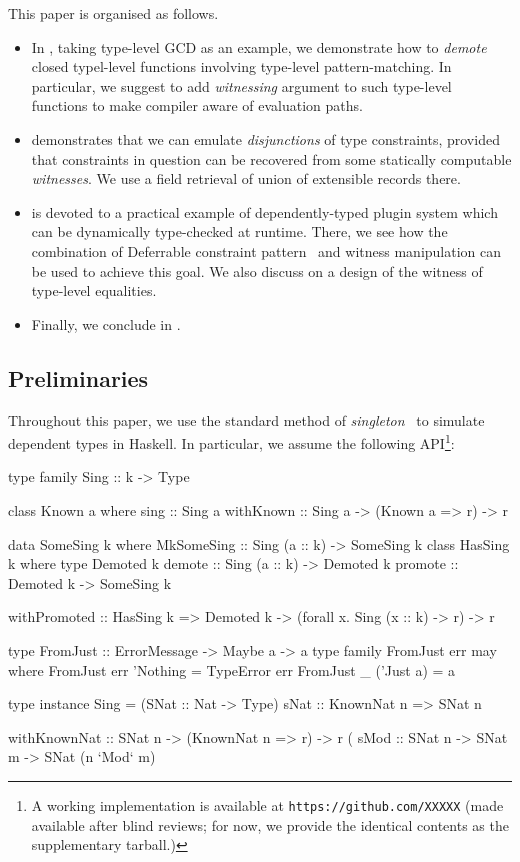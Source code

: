 \documentclass[demotion-paper.tex]{subfiles}
\begin{document}
This paper is organised as follows.
\begin{itemize}
  \item In , taking type-level GCD as an example, we demonstrate how to \emph{demote} closed typel-level functions involving type-level pattern-matching.
  In particular, we suggest to add \emph{witnessing} argument to such type-level functions to make compiler aware of evaluation paths.
  \item {} demonstrates that we can emulate \emph{disjunctions} of type constraints, provided that constraints in question can be recovered from some statically computable \emph{witnesses}.
  We use a field retrieval of union of extensible records there.
  \item {} is devoted to a practical example of dependently-typed plugin system which can be dynamically type-checked at runtime.
  There, we see how the combination of Deferrable constraint pattern~\cite{Kmett:2020ab} and witness manipulation can be used to achieve this goal.
  We also discuss on a design of the witness of type-level equalities.
  \item Finally, we conclude in .
\end{itemize}

\subsection{Preliminaries}
Throughout this paper, we use the standard method of \emph{singleton}~\cite{Eisenberg:2012} to simulate dependent types in Haskell.
In particular, we assume the following API\footnote{A working implementation is available at \texttt{https://github.com/XXXXX} (made available after blind reviews; for now, we provide the identical contents as the supplementary tarball.)}:

\begin{code}
type family Sing :: k -> Type

class Known a where
  sing :: Sing a
withKnown :: Sing a -> (Known a => r) -> r

data SomeSing k where
  MkSomeSing :: Sing (a :: k) -> SomeSing k
class HasSing k where
  type Demoted k 
  demote :: Sing (a :: k) -> Demoted k
  promote :: Demoted k -> SomeSing k

withPromoted :: HasSing k
  => Demoted k
  -> (forall x. Sing (x :: k) -> r) -> r

type FromJust :: ErrorMessage -> Maybe a -> a
type family FromJust err may where 
  FromJust err 'Nothing = TypeError err
  FromJust _ ('Just a)  = a

type instance Sing = (SNat :: Nat -> Type)
sNat :: KnownNat n => SNat n

withKnownNat :: SNat n -> (KnownNat n => r) -> r
(%
sMod :: SNat n -> SNat m -> SNat (n `Mod` m)
\end{code}
\end{document}
